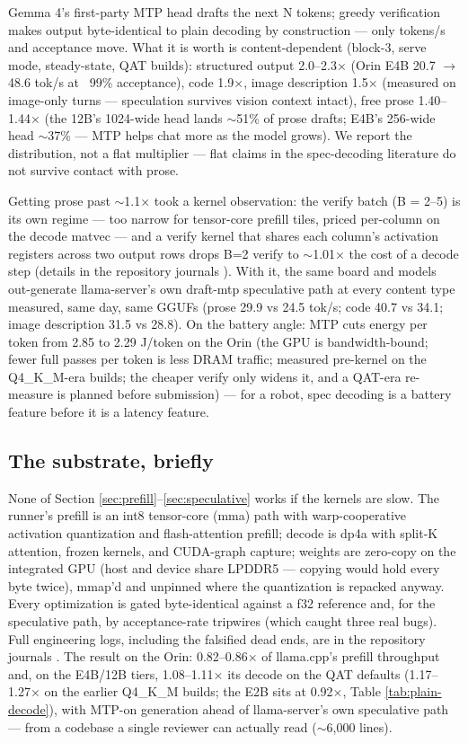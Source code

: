 \documentclass{article}
\begin{document}
Gemma 4's first-party MTP head drafts the next N tokens; greedy verification makes output byte-identical to plain decoding by construction --- only tokens/s and acceptance move. What it is worth is content-dependent (block-3, serve mode, steady-state, QAT builds): structured output 2.0--2.3× (Orin E4B 20.7 $\rightarrow$ 48.6 tok/s at ~99\% acceptance), code 1.9×, image description 1.5× (measured on image-only turns --- speculation survives vision context intact), free prose 1.40--1.44× (the 12B's 1024-wide head lands $\sim$51\% of prose drafts; E4B's 256-wide head $\sim$37\% --- MTP helps chat more as the model grows). We report the distribution, not a flat multiplier --- flat claims in the spec-decoding literature do not survive contact with prose.

Getting prose past $\sim$1.1× took a kernel observation: the verify batch (B = 2--5) is its own regime --- too narrow for tensor-core prefill tiles, priced per-column on the decode matvec --- and a verify kernel that shares each column's activation registers across two output rows drops B=2 verify to $\sim$1.01× the cost of a decode step (details in the repository journals \citep{littlegemma}). With it, the same board and models out-generate llama-server's own draft-mtp speculative path at every content type measured, same day, same GGUFs (prose 29.9 vs 24.5 tok/s; code 40.7 vs 34.1; image description 31.5 vs 28.8). On the battery angle: MTP cuts energy per token from 2.85 to 2.29 J/token on the Orin (the GPU is bandwidth-bound; fewer full passes per token is less DRAM traffic; measured pre-kernel on the Q4\_K\_M-era builds; the cheaper verify only widens it, and a QAT-era re-measure is planned before submission) --- for a robot, spec decoding is a battery feature before it is a latency feature.

\subsection{The substrate, briefly}

None of Section \ref{sec:prefill}--\ref{sec:speculative} works if the kernels are slow. The runner's prefill is an int8 tensor-core (mma) path with warp-cooperative activation quantization and flash-attention prefill; decode is dp4a with split-K attention, frozen kernels, and CUDA-graph capture; weights are zero-copy on the integrated GPU (host and device share LPDDR5 --- copying would hold every byte twice), mmap'd and unpinned where the quantization is repacked anyway. Every optimization is gated byte-identical against a f32 reference and, for the speculative path, by acceptance-rate tripwires (which caught three real bugs). Full engineering logs, including the falsified dead ends, are in the repository journals \citep{littlegemma}. The result on the Orin: 0.82--0.86× of llama.cpp's prefill throughput and, on the E4B/12B tiers, 1.08--1.11× its decode on the QAT defaults (1.17--1.27× on the earlier Q4\_K\_M builds; the E2B sits at 0.92×, Table \ref{tab:plain-decode}), with MTP-on generation ahead of llama-server's own speculative path --- from a codebase a single reviewer can actually read ($\sim$6,000 lines).
\end{document}
